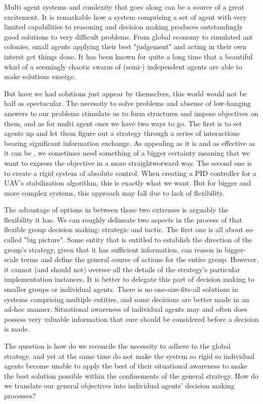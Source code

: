 Multi agent systems and comlexity that goes along can be a source of a great excitement.
It is remarkable how a system comprising a set of agent with very limited capabilities to reasoning and decision making produces outstandingly good solutions to very difficult problems.
From global economy to simulated ant colonies, small agents applying their best "judgement" and acting in their own interst get things done.
It has been known for quite a long time that a beautiful whirl of a seemingly chaotic swarm of (semi-) independent agents are able to make solutions emerge.

But have we had solutions just appear by themselves, this world would not be half as spectacular.
The necessity to solve problems and absense of low-hanging answers to our problems stimulate us to form structures and impose objectives on them, and as for multi agent ones we have two ways to go.
The first is to set agents up and let them figure out a strategy through a series of interactions bearing significant information exchange.
As appealing as it is and as effective as it can be \cite{dorigo-2006}, we sometimes need something of a bigger certainty meaning that we want to express the objective in a more straightworward way.
The second one is to create a rigid system of absolute control.
When creating a PID controller for a UAV's stabilization algorithm, this is exactly what we want.
But for bigger and more complex systems, this approach may fall due to lack of flexibility.

The advantage of options in between those two extremes is arguably the flexibility it has. We can roughly delineate two
aspects in the process of that flexible group decision making: strategic and tactic. The first one is all about
so-called "big picture". Some entity that is entitled to establish the direction of the group's strategy, given that it
has sufficient information, can reason in bigger-scale terms and define the general course of actions for the entire
group. However, it cannot (and should not) oversee all the details of the strategy's particular implementation
instances. It is better to delegate this part of decision making to smaller groups or individual agents. There is no
one-size-fits-all solutions in systems comprising multiple entities, and some decisions are better made in an ad-hoc
manner.
Situational awareness \cite{endsley-1995} of individual agents may and often does possess very valuable information that
sure should be considered before a decision is made.

The question is how do we reconcile the necessity to adhere to the global strategy, and yet at the same time do not make
the system so rigid so individual agents become unable to apply the best of their situational awareness to make the best
solution possible within the confinements of the general strategy. How do we translate our general objectives into
individual agents' decision making processes?
